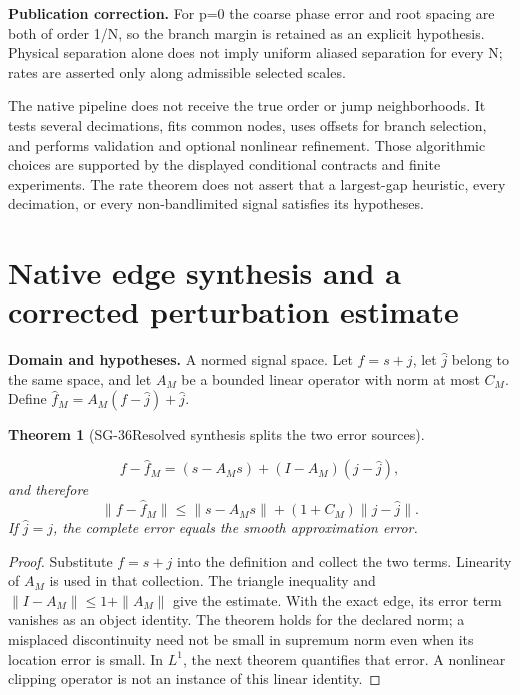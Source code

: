 \documentclass[11pt]{article}
\newtheorem{theorem}{Theorem}[section]
\theoremstyle{definition}\newtheorem{definition}[theorem]{Definition}
\theoremstyle{remark}\newtheorem{remark}[theorem]{Remark}
\begin{document}
\par{\small\textbf{Publication correction.} For p=0 the coarse phase error and root spacing are both of order 1/N, so the branch margin is retained as an explicit hypothesis. Physical separation alone does not imply uniform aliased separation for every N; rates are asserted only along admissible selected scales.}\par


The native pipeline does not receive the true order or jump neighborhoods.
It tests several decimations, fits common nodes, uses offsets for branch
selection, and performs validation and optional nonlinear refinement.
Those algorithmic choices are supported by the displayed conditional
contracts and finite experiments. The rate theorem does not assert that a
largest-gap heuristic, every decimation, or every non-bandlimited signal
satisfies its hypotheses.


\section{Native edge synthesis and a corrected perturbation estimate}


\par{\small\textbf{Domain and hypotheses.} A normed signal space. Let $f=s+j$, let $\widehat j$ belong to the same space, and let $A_M$ be a bounded linear operator with norm at most $C_M$. Define $\widehat f_M=A_M(f-\widehat j)+\widehat j$.}\par
\begin{theorem}[SG-36\quad Resolved synthesis splits the two error sources]\label{SG-36}

\[
 f-\widehat f_M=(s-A_Ms)+(I-A_M)(j-\widehat j),
\]
and therefore
\[
 \|f-\widehat f_M\|\le\|s-A_Ms\|+(1+C_M)\|j-\widehat j\|.
\]
If $\widehat j=j$, the complete error equals the smooth approximation error.

\end{theorem}
\begin{proof}

Substitute $f=s+j$ into the definition and collect the two terms. Linearity
of $A_M$ is used in that collection. The triangle inequality and
$\|I-A_M\|\le1+\|A_M\|$ give the estimate. With the exact edge, its error
term vanishes as an object identity. The theorem holds for the declared norm;
a misplaced discontinuity need not be small in supremum norm even when its
location error is small. In $L^1$, the next theorem quantifies that error.
A nonlinear clipping operator is not an instance of this linear identity.

\end{proof}
\end{document}
